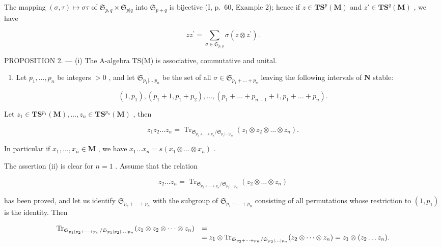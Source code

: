 The mapping \((\sigma, \tau) \mapsto \sigma \tau\) of \(\mathfrak{S}_{p,q} \times \mathfrak{S}_{p|q}\) into \(\mathfrak{S}_{p+q}\) is bijective (I, p.~60, Example 2); hence if \(z \in \mathbf{T}\mathbf{S}^p(\mathbf{M})\) and \(z' \in \mathbf{T}\mathbf{S}^q(\mathbf{M})\) , we have

\[
z z ^ {\prime} = \sum_ {\sigma \in \mathfrak {S} _ {p, q}} \sigma (z \otimes z ^ {\prime}).\tag{5}
\]

PROPOSITION 2. --- (i) The A-algebra TS(M) is associative, commutative and unital.

\begin{enumerate}
\def\labelenumi{(\roman{enumi})}
\setcounter{enumi}{1}
\tightlist
\item
  Let \(p_1, \ldots, p_n\) be integers \(> 0\) , and let \(\mathfrak{S}_{p_1 | \ldots | p_n}\) be the set of all \(\sigma \in \mathfrak{S}_{p_1 + \ldots + p_n}\) leaving the following intervals of \(\mathbf{N}\) stable:
\end{enumerate}

\[
\left(1, p _ {1}\right), \left(p _ {1} + 1, p _ {1} + p _ {2}\right), \dots , \left(p _ {1} + \dots + p _ {n - 1} + 1, p _ {1} + \dots + p _ {n}\right).
\]

Let \(z_{1}\in \mathbf{T}\mathbf{S}^{p_{1}}(\mathbf{M}),\ldots ,z_{n}\in \mathbf{T}\mathbf{S}^{p_{n}}(\mathbf{M})\) , then

\[
z _ {1} z _ {2} \dots z _ {n} = \operatorname{Tr} _ {\mathfrak {S} _ {p _ {1} + \dots + p _ {n}} / \mathfrak {S} _ {p _ {1} | \dots | p _ {n}}} (z _ {1} \otimes z _ {2} \otimes \dots \otimes z _ {n}).
\]

In particular if \(x_1, \ldots, x_n \in \mathbf{M}\) , we have \(x_1 \ldots x_n = s(x_1 \otimes \ldots \otimes x_n)\) .

The assertion (ii) is clear for \(n = 1\) . Assume that the relation

\[
z _ {2} \dots z _ {n} = \operatorname{Tr} _ {\mathfrak {S} _ {p _ {2} + \dots + p _ {n}} / \mathfrak {S} _ {p _ {2} | \dots | p _ {n}}} (z _ {2} \otimes \dots \otimes z _ {n})
\]

has been proved, and let us identify \(\mathfrak{S}_{p_2 + \ldots + p_n}\) with the subgroup of \(\mathfrak{S}_{p_1 + \ldots + p_n}\) consisting of all permutations whose restriction to \((1, p_1)\) is the identity. Then

\[
\begin{array}{r l} \operatorname{Tr} _ {\mathfrak {S} _ {p _ {1} | p _ {2} + \dots + p _ {n}} / \mathfrak {S} _ {p _ {1} | p _ {2} | \dots | p _ {n}}} (z _ {1} \otimes z _ {2} \otimes \dots \otimes z _ {n}) & = \\ & = z _ {1} \otimes \operatorname{Tr} _ {\mathfrak {S} _ {p _ {2} + \dots + p _ {n}} / \mathfrak {S} _ {p _ {2} | \dots | p _ {n}}} (z _ {2} \otimes \dots \otimes z _ {n}) = z _ {1} \otimes (z _ {2} \dots z _ {n}). \end{array}
\]

